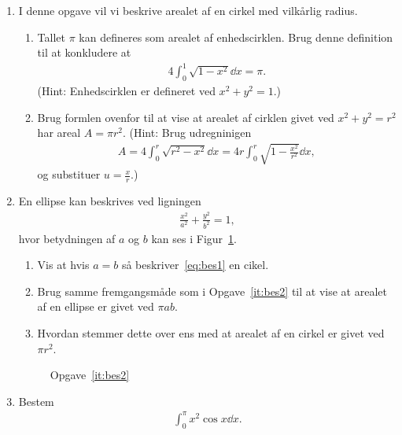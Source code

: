 \begin{enumerate}
	\item I denne opgave vil vi beskrive arealet af en cirkel med vilkårlig radius.
	\begin{enumerate}
		\item Tallet $\pi$ kan defineres som arealet af enhedscirklen. Brug denne definition til at konkludere at
		\begin{align*}
		4\int_0^1 \sqrt{1-x^2}\dd x=\pi.
		\end{align*}
		(Hint: Enhedscirklen er defineret ved $x^2+y^2=1$.)
		\item Brug formlen ovenfor til at vise at arealet af cirklen givet ved $x^2+y^2=r^2$ har areal $A=\pi r^2$.
		(Hint: Brug udregninigen
		\begin{align*}
		A=4\int_0^r \sqrt{r^2-x^2}\dd x=4r\int_0^r \sqrt{1-\frac{x^2}{r^2}}\dd x,
		\end{align*}
		og substituer $u=\frac{x}{r}$.)
	\end{enumerate}
	\item\label{it:bes2} En ellipse kan beskrives ved ligningen 
	\begin{align}\label{eq:bes1}
	\frac{x^2}{a^2}+\frac{y^2}{b^2}=1,
	\end{align}
	 hvor betydningen af $a$ og $b$ kan ses i Figur~\ref{fig:bes2}.
			\begin{enumerate}
				\item Vis at hvis $a=b$ så beskriver~\eqref{eq:bes1} en cikel. 
				\item Brug samme fremgangsmåde som i Opgave~\ref{it:bes2} til at vise at arealet af en ellipse er givet ved $\pi a b$.
				\item Hvordan stemmer dette over ens med at arealet af en cirkel er givet ved $\pi r^2$.
			\end{enumerate}

	\begin{figure}
	\centering
	\caption{Opgave~\ref{it:bes2}}
	\label{fig:bes2}
	\end{figure}
	\item Bestem
	\begin{align*}
	 \int_0^\pi x^2\cos x \dd x.
	\end{align*}
	

\end{enumerate}
